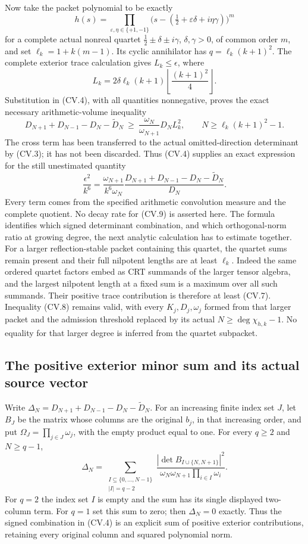 Now take the packet polynomial to be exactly
\[
 h(s)=\prod_{\varepsilon,\eta\in\{+1,-1\}}
 \bigl(s-(\tfrac12+\varepsilon\delta+i\eta\gamma)\bigr)^m
\]
for a complete actual nonreal quartet
$\frac12\pm\delta\pm i\gamma$, $\delta,\gamma>0$, of common order
$m$, and set $\ell_k=1+k(m-1)$. Its cyclic annihilator has
$q=\ell_k(k+1)^2$. The complete exterior trace calculation gives
$L_k\leq\epsilon$, where
\[
 L_k=2\delta\ell_k(k+1)
              \left\lfloor\frac{(k+1)^2}{4}\right\rfloor.
 \tag{CV.7}
\]
Substitution in (CV.4), with all quantities nonnegative, proves the
exact necessary arithmetic-volume inequality
\[
 \boxed{
 D_{N+1}+D_{N-1}-D_N-\widetilde D_N
 \ \geq\ \frac{\omega_N}{\omega_{N+1}}D_N L_k^2,
 \qquad N\geq\ell_k(k+1)^2-1.}
 \tag{CV.8}
\]
The cross term has been transferred to the actual omitted-direction
determinant by (CV.3); it has not been discarded. Thus (CV.4) supplies
an exact expression for the still unestimated quantity
\[
 \frac{\epsilon^2}{k^6}
 =\frac{\omega_{N+1}}{k^6\omega_N}
 \frac{D_{N+1}+D_{N-1}-D_N-\widetilde D_N}{D_N}.
 \tag{CV.9}
\]
Every term comes from the specified arithmetic convolution measure and
the complete quotient. No decay rate for (CV.9) is asserted here.
The formula identifies which signed determinant combination, and which
orthogonal-norm ratio at growing degree, the next analytic calculation
has to estimate together.
For a larger reflection-stable packet containing this quartet, the
quartet sums remain present and their full nilpotent lengths are at
least $\ell_k$. Indeed the same ordered quartet factors embed as
CRT summands of the larger tensor algebra, and the largest nilpotent
length at a fixed sum is a maximum over all such summands. Their
positive trace contribution is therefore at least (CV.7).
Inequality (CV.8) remains valid, with every $K_j,D_j,\omega_j$
formed from that larger packet and the admission threshold replaced
by its actual $N\geq\deg\chi_{h,k}-1$. No equality for that larger
degree is inferred from the quartet subpacket.

\subsection{The positive exterior minor sum and its actual source vector}

Write
$\Delta_N=D_{N+1}+D_{N-1}-D_N-\widetilde D_N$.
For an increasing finite index set $J$, let $B_J$ be the matrix
whose columns are the original $b_j$, in that increasing order, and
put $\Omega_J=\prod_{j\in J}\omega_j$, with the empty product equal
to one. For every $q\geq2$ and $N\geq q-1$,
\[
 \boxed{
 \Delta_N=
 \sum_{\substack{I\subseteq\{0,\ldots,N-1\}\\ |I|=q-2}}
 \frac{\left|\det B_{I\cup\{N,N+1\}}\right|^2}
      {\omega_N\omega_{N+1}\prod_{i\in I}\omega_i}.}
 \tag{CV.10}
\]
For $q=2$ the index set $I$ is empty and the sum has its single
displayed two-column term. For $q=1$ set this sum to zero; then
$\Delta_N=0$ exactly. Thus the signed combination in (CV.4) is an
explicit sum of positive exterior contributions, retaining every
original column and squared polynomial norm.


